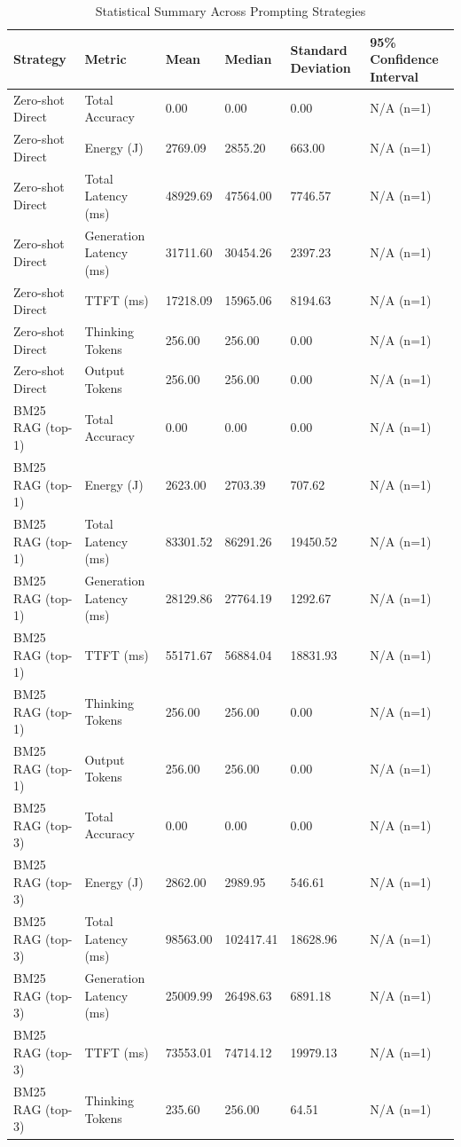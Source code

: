 \begin{table}
\caption{Statistical Summary Across Prompting Strategies}
\label{tab:statistical_summary}
\begin{tabular}{llllll}
\toprule
Strategy & Metric & Mean & Median & Standard Deviation & 95\% Confidence Interval \\
\midrule
Zero-shot Direct & Total Accuracy & 0.00 & 0.00 & 0.00 & N/A (n=1) \\
Zero-shot Direct & Energy (J) & 2769.09 & 2855.20 & 663.00 & N/A (n=1) \\
Zero-shot Direct & Total Latency (ms) & 48929.69 & 47564.00 & 7746.57 & N/A (n=1) \\
Zero-shot Direct & Generation Latency (ms) & 31711.60 & 30454.26 & 2397.23 & N/A (n=1) \\
Zero-shot Direct & TTFT (ms) & 17218.09 & 15965.06 & 8194.63 & N/A (n=1) \\
Zero-shot Direct & Thinking Tokens & 256.00 & 256.00 & 0.00 & N/A (n=1) \\
Zero-shot Direct & Output Tokens & 256.00 & 256.00 & 0.00 & N/A (n=1) \\
BM25 RAG (top-1) & Total Accuracy & 0.00 & 0.00 & 0.00 & N/A (n=1) \\
BM25 RAG (top-1) & Energy (J) & 2623.00 & 2703.39 & 707.62 & N/A (n=1) \\
BM25 RAG (top-1) & Total Latency (ms) & 83301.52 & 86291.26 & 19450.52 & N/A (n=1) \\
BM25 RAG (top-1) & Generation Latency (ms) & 28129.86 & 27764.19 & 1292.67 & N/A (n=1) \\
BM25 RAG (top-1) & TTFT (ms) & 55171.67 & 56884.04 & 18831.93 & N/A (n=1) \\
BM25 RAG (top-1) & Thinking Tokens & 256.00 & 256.00 & 0.00 & N/A (n=1) \\
BM25 RAG (top-1) & Output Tokens & 256.00 & 256.00 & 0.00 & N/A (n=1) \\
BM25 RAG (top-3) & Total Accuracy & 0.00 & 0.00 & 0.00 & N/A (n=1) \\
BM25 RAG (top-3) & Energy (J) & 2862.00 & 2989.95 & 546.61 & N/A (n=1) \\
BM25 RAG (top-3) & Total Latency (ms) & 98563.00 & 102417.41 & 18628.96 & N/A (n=1) \\
BM25 RAG (top-3) & Generation Latency (ms) & 25009.99 & 26498.63 & 6891.18 & N/A (n=1) \\
BM25 RAG (top-3) & TTFT (ms) & 73553.01 & 74714.12 & 19979.13 & N/A (n=1) \\
BM25 RAG (top-3) & Thinking Tokens & 235.60 & 256.00 & 64.51 & N/A (n=1) \\

\end{tabular}
\end{table}
